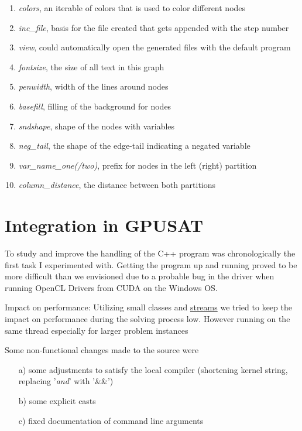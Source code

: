 \documentclass[a4paper, 12pt]{scrartcl}
\begin{document}
\begin{enumerate}
	\item \textit{colors}, an iterable of colors that is used to color different nodes
	\item \textit{inc\_file}, basis for the file created that gets appended with the step number
	\item \textit{view}, could automatically open the generated files with the default program
	\item \textit{fontsize}, the size of all text in this graph
	\item \textit{penwidth}, width of the lines around nodes
	\item \textit{basefill}, filling of the background for nodes
	\item \textit{sndshape}, shape of the nodes with variables
	\item \textit{neg\_tail}, the shape of the edge-tail indicating a negated variable
	\item \textit{var\_name\_one(/two)}, prefix for nodes in the left (right) partition
	\item \textit{column\_distance}, the distance between both partitions
\end{enumerate}




\newpage
\section{Integration in GPUSAT}
To study and improve the handling of the C++ program was chronologically the first task I experimented with.
Getting the program up and running proved to be more difficult than we envisioned due to a probable bug in the driver when running OpenCL Drivers from CUDA on the Windows OS.

Impact on performance:
Utilizing small classes and \href{http://www.cplusplus.com/reference/sstream/stringstream/}{streams} we tried to keep the impact on performance during the solving process low. However running on the same thread especially for larger problem instances 

Some non-functional changes made to the source were 
\begin{itemize}
	\item[a)] some adjustments to satisfy the local compiler (shortening kernel string, replacing '\emph{and}' with '\&\&')
	\item[b)] some explicit casts
	\item[c)] fixed documentation of command line arguments
\end{itemize}
\end{document}
